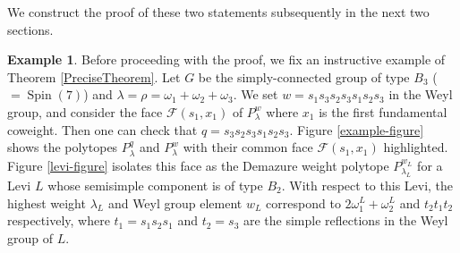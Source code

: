 \documentclass[12pt,reqno]{amsart}
\newcommand{\op}{\operatorname}
\theoremstyle{definition}
\newtheorem{example}{Example}
\begin{document}
We construct the proof of these two statements subsequently in the next two sections. 










\begin{example}
Before proceeding with the proof, we fix an instructive example of Theorem \ref{PreciseTheorem}. Let $G$ be the simply-connected group of type $B_3$ ($=\op{Spin}(7)$) and $\lambda=\rho=\omega_1+\omega_2+\omega_3$. We set $w=s_1s_3s_2s_3s_1s_2s_3$ in the Weyl group, and consider the face $\mathcal{F}(s_1, x_1)$ of $P_\lambda^w$ where $x_1$ is the first fundamental coweight. Then one can check that $q=s_3s_2s_3s_1s_2s_3$. Figure \ref{example-figure} shows the polytopes $P_\lambda^q$ and $P_\lambda^w$ with their common face $\mathcal{F}(s_1,x_1)$ highlighted. Figure \ref{levi-figure} isolates this face as the Demazure weight polytope $P_{\lambda_L}^{w_L}$ for a Levi $L$ whose semisimple component is of type $B_2$. With respect to this Levi, the highest weight $\lambda_L$ and Weyl group element $w_L$ correspond to $2\omega^L_1+\omega^L_2$ and $t_2t_1t_2$ respectively, where $t_1=s_1s_2s_1$ and $t_2=s_3$ are the simple reflections in the Weyl group of $L$.  
\end{example}



\end{document}
